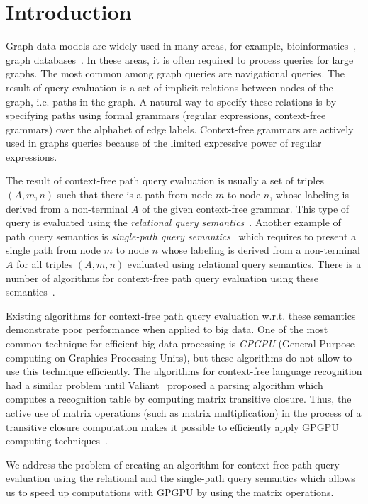 \section{Introduction}
Graph data models are widely used in many areas, for example, bioinformatics~\cite{Bio}, graph databases~\cite{graphDB}. In these areas, it is often required to process queries for large graphs. The most common among graph queries are navigational queries. The result of query evaluation is a set of implicit relations between nodes of the graph, i.e. paths in the graph. A natural way to specify these relations is by specifying paths using formal grammars (regular expressions, context-free grammars) over the alphabet of edge labels. Context-free grammars are actively used in graphs queries because of the limited expressive power of regular expressions. 

The result of context-free path query evaluation is usually a set of triples $(A, m, n)$ such that there is a path from node $m$ to node $n$, whose labeling is derived from a non-terminal $A$ of the given context-free grammar. This type of query is evaluated using the \textit{relational query semantics}~\cite{hellingsRelational}. Another example of path query semantics is \textit{single-path query semantics}~\cite{hellingsPathQuerying} which requires to present a single path from node $m$ to node $n$ whose labeling is derived from a non-terminal $A$ for all triples $(A, m, n)$ evaluated using relational query semantics. There is a number of algorithms for context-free path query evaluation using these semantics~\cite{GLL, hellingsRelational, RDF}.

Existing algorithms for context-free path query evaluation w.r.t. these semantics demonstrate poor performance when applied to big data. One of the most common technique for efficient big data processing is \textit{GPGPU} (General-Purpose computing on Graphics Processing Units), but these algorithms do not allow to use this technique efficiently. The algorithms for context-free language recognition had a similar problem until Valiant~\cite{valiant} proposed a parsing algorithm which computes a recognition table by computing matrix transitive closure. Thus, the active use of matrix operations (such as matrix multiplication) in the process of a transitive closure computation makes it possible to efficiently apply GPGPU computing techniques~\cite{matricesOnGPGPU}.

We address the problem of creating an algorithm for context-free path query evaluation using the relational and the single-path query semantics which allows us to speed up computations with GPGPU by using the matrix operations.

